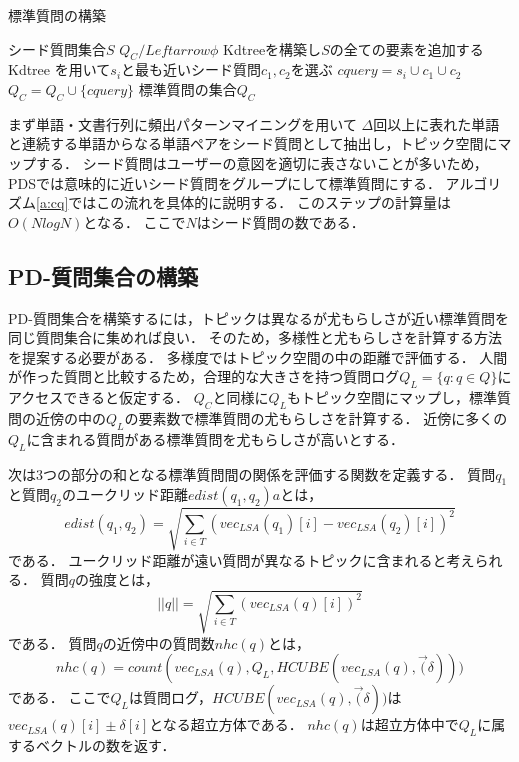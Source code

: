 \documentclass[master]{suribt}
\theoremstyle{definition}
\begin{document}
 \begin{algorithm}
 \caption{標準質問の構築}
 \begin{algorithmic}[1]
  \Require シード質問集合$S$
  \State $Q_C /Leftarrow \phi$
  \State Kdtreeを構築し$S$の全ての要素を追加する
  \State Kdtree を用いて$s_i$と最も近いシード質問$c_1,c_2$を選ぶ
  \State $cquery = s_i \cup c_1 \cup c_2$
  \State $Q_C = Q_C \cup \{cquery\}$
  \EndIf
  \EndFor
  \Ensure 標準質問の集合$Q_C$
 \end{algorithmic}
 \label{a:cq}
 \end{algorithm}

 まず単語・文書行列に頻出パターンマイニング\cite{}を用いて
 $\Delta$回以上に表れた単語と連続する単語からなる単語ペアをシード質問として抽出し，トピック空間にマップする．
 シード質問はユーザーの意図を適切に表さないことが多いため，
 PDSでは意味的に近いシード質問をグループにして標準質問にする．
 アルゴリズム\ref{a:cq}ではこの流れを具体的に説明する．
 このステップの計算量は$O(NlogN)$となる．
 ここで$N$はシード質問の数である．

 \subsection{PD-質問集合の構築}
 PD-質問集合を構築するには，トピックは異なるが尤もらしさが近い標準質問を同じ質問集合に集めれば良い．
 そのため，多様性と尤もらしさを計算する方法を提案する必要がある．
 多様度ではトピック空間の中の距離で評価する．
 人間が作った質問と比較するため，合理的な大きさを持つ質問ログ$Q_L = \{q: q \in Q\}$にアクセスできると仮定する．
 $Q_C$と同様に$Q_L$もトピック空間にマップし，標準質問の近傍の中の$Q_L$の要素数で標準質問の尤もらしさを計算する．
 近傍に多くの$Q_L$に含まれる質問がある標準質問を尤もらしさが高いとする．

 次は3つの部分の和となる標準質問間の関係を評価する関数を定義する．
 質問$q_1$と質問$q_2$のユークリッド距離$edist(q_1,q_2)a$とは，
 \begin{equation}
 edist(q_1,q_2) = \sqrt{\sum_{i \in T}(vec_{LSA}(q_1)[i] - vec_{LSA}(q_2)[i])^2}
 \end{equation}
 である．
 ユークリッド距離が遠い質問が異なるトピックに含まれると考えられる．
 質問$q$の強度とは，
 \begin{equation}
 ||q|| = \sqrt{\sum_{i \in T}(vec_{LSA}(q)[i])^2}
 \end{equation}
 である．
 質問$q$の近傍中の質問数$nhc(q)$とは，
 \begin{equation}
 nhc(q) = count(vec_{LSA}(q),Q_L,HCUBE(vec_{LSA}(q),\vec(\delta)))
 \end{equation}
 である．
 ここで$Q_L$は質問ログ，$HCUBE(vec_{LSA}(q),\vec(\delta))$は$vec_{LSA}(q)[i] \pm \delta[i]$となる超立方体である．
 $nhc(q)$は超立方体中で$Q_L$に属するベクトルの数を返す．
 
\end{document}
